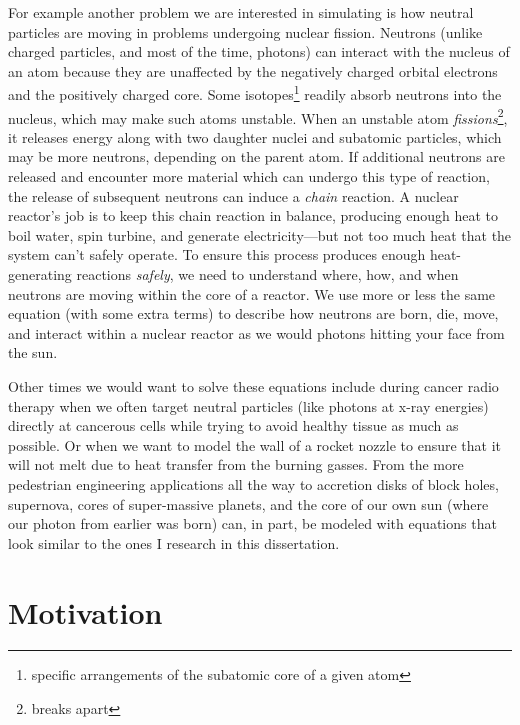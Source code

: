 For example another problem we are interested in simulating is how neutral particles are moving in problems undergoing nuclear fission.
Neutrons (unlike charged particles, and most of the time, photons) can interact with the nucleus of an atom because they are unaffected by the negatively charged orbital electrons and the positively charged core.
Some isotopes\footnote{specific arrangements of the subatomic core of a given atom} readily absorb neutrons into the nucleus, which may make such atoms unstable.
When an unstable atom \textit{fissions}\footnote{breaks apart}, it releases energy along with two daughter nuclei and subatomic particles, which may be more neutrons, depending on the parent atom.
If additional neutrons are released and encounter more material which can undergo this type of reaction, the release of subsequent neutrons can induce a \textit{chain} reaction.
A nuclear reactor's job is to keep this chain reaction in balance, producing enough heat to boil water, spin turbine, and generate electricity---but not too much heat that the system can't safely operate.
To ensure this process produces enough heat-generating reactions \textit{safely}, we need to understand where, how, and when neutrons are moving within the core of a reactor.
We use more or less the same equation (with some extra terms) to describe how neutrons are born, die, move, and interact within a nuclear reactor as we would photons hitting your face from the sun.

Other times we would want to solve these equations include during cancer radio therapy when we often target  neutral particles (like photons at x-ray energies) directly at cancerous cells while trying to avoid healthy tissue as much as possible.
Or when we want to model the wall of a rocket nozzle to ensure that it will not melt due to heat transfer from the burning gasses.
From the more pedestrian engineering applications all the way to accretion disks of block holes, supernova, cores of super-massive planets, and the core of our own sun (where our photon from earlier was born) can, in part, be modeled with equations that look similar to the ones I research in this dissertation.


\section{Motivation}


